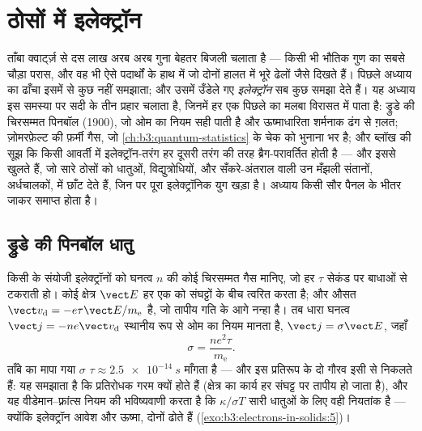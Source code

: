 \chapter{ठोसों में इलेक्ट्रॉन}\label{ch:b3:electrons-in-solids}


ताँबा क्वार्ट्ज़ से दस लाख अरब अरब गुना बेहतर बिजली चलाता है --- किसी
भी भौतिक गुण का सबसे चौड़ा परास, और वह भी ऐसे पदार्थों के हाथ में जो
दोनों हालत में भूरे ढेलों जैसे दिखते हैं। पिछले अध्याय का ढाँचा इसमें
से कुछ नहीं समझाता; और उसमें उँडेले गए \emph{इलेक्ट्रॉन} सब कुछ समझा
देते हैं। यह अध्याय इस समस्या पर सदी के तीन प्रहार चलाता है, जिनमें
हर एक पिछले का मलबा विरासत में पाता है: ड्रुडे की चिरसम्मत पिनबॉल
(1900), जो ओम का नियम सही पाती है और ऊष्माधारिता शर्मनाक ढंग से ग़लत;
ज़ोमरफ़ेल्ट की फ़र्मी गैस, जो \cref{ch:b3:quantum-statistics} के चेक को
भुनाना भर है; और ब्लॉख की सूझ कि किसी आवर्ती  में
इलेक्ट्रॉन-तरंग हर दूसरी तरंग की तरह ब्रैग-परावर्तित होती है --- और
इससे \emph{} खुलते हैं, जो सारे ठोसों को धातुओं,
विद्युत्रोधियों, और सँकरे-अंतराल वाली उन मँझली संतानों,
अर्धचालकों, में छाँट देते हैं, जिन पर पूरा इलेक्ट्रॉनिक युग खड़ा है।
अध्याय किसी सौर पैनल के भीतर जाकर समाप्त होता है।

\section{ड्रुडे की पिनबॉल धातु}

\begin{proposition}[ड्रुडे चालकता]\label{prop:b3:electrons-in-solids:drude}
किसी  के संयोजी इलेक्ट्रॉनों को घनत्व $n$ की कोई चिरसम्मत गैस
मानिए, जो हर $\tau$ सेकंड पर बाधाओं से टकराती हो। कोई क्षेत्र $\vect E$
हर एक को संघट्टों के बीच त्वरित करता है; और औसत \emph{} $\vect v_{\text{d}} = -e\tau\vect E/m_{\text{e}}$ है,
जो तापीय गति के आगे नन्हा है। तब धारा घनत्व $\vect j =
-ne\vect v_{\text{d}}$ स्थानीय रूप से ओम का नियम मानता है,
$\vect j = \sigma\vect E$, जहाँ
\[
\sigma = \frac{ne^2\tau}{m_{\text{e}}} .
\]
ताँबे का मापा गया $\sigma$ $\tau \approx \qty{2.5e-14}{s}$ माँगता है
--- और इस प्रतिरूप के दो गौरव इसी से निकलते हैं: यह समझाता है कि
प्रतिरोधक गरम क्यों होते हैं (क्षेत्र का कार्य हर संघट्ट पर तापीय हो
जाता है), और यह वीडेमान--फ़्रांत्स नियम की भविष्यवाणी करता है कि
$\kappa/\sigma T$ सारी धातुओं के लिए वही नियतांक है --- क्योंकि
इलेक्ट्रॉन आवेश और ऊष्मा, दोनों ढोते हैं
(\cref{exo:b3:electrons-in-solids:5})।
\end{proposition}


